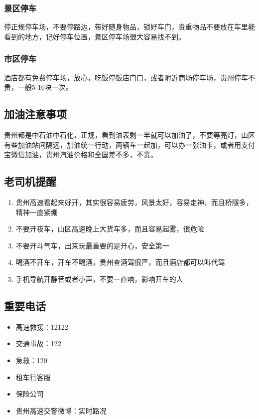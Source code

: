 \documentclass[12pt,a4paper,UTF8]{ctexart}
\begin{document}
\subsubsection{景区停车}
停正规停车场，不要停路边，带好随身物品，锁好车门，贵重物品不要放在车里能看到的地方，记好停车位置，景区停车场很大容易找不到。

\subsubsection{市区停车}
酒店都有免费停车场，放心，吃饭停饭店门口，或者附近商场停车场，贵州停车不贵，一般5-10块一次。

\subsection{加油注意事项}
贵州都是中石油中石化，正规，看到油表剩一半就可以加油了，不要等亮灯，山区有些加油站间隔远，加油统一行动，两辆车一起加，可以办一张油卡，或者用支付宝微信加油，贵州汽油价格和全国差不多，不贵。

\subsection{老司机提醒}
\begin{enumerate}
\item 贵州高速看起来好开，其实很容易疲劳，风景太好，容易走神，而且桥隧多，精神一直紧绷
\item 不要开夜车，山区高速晚上大货车多，而且容易起雾，很危险
\item 不要开斗气车，出来玩最重要的是开心，安全第一
\item 喝酒不开车，开车不喝酒，贵州查酒驾很严，而且酒店都可以叫代驾
\item 手机导航开静音或者小声，不要一直响，影响开车的人
\end{enumerate}

\subsection{重要电话}
\begin{itemize}
\item 高速救援：12122
\item 交通事故：122
\item 急救：120
\item 租车行客服
\item 保险公司
\item 贵州高速交警微博：实时路况
\end{itemize}
\end{document}
